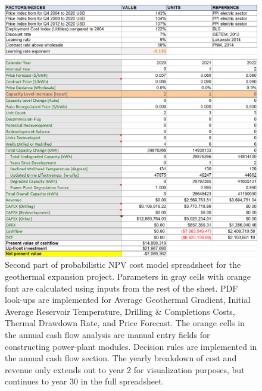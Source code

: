 \begin{figure}[H]
\centering
\includegraphics[width=\textwidth]{templates/images/Figure-Flexible_Model_SheetB.pdf}
\caption[Probabilistic cost model spreadsheet (part 2)]{Second part of probabilistic NPV cost model spreadsheet for the geothermal expansion project. Parameters in gray cells with orange font are calculated using inputs from the rest of the sheet. PDF look-ups are implemented for Average Geothermal Gradient, Initial Average Reservoir Temperature, Drilling \& Completions Costs, Thermal Drawdown Rate, and Price Forecast. The orange cells in the annual cash flow analysis are manual entry fields for constructing power-plant modules. Decision rules are implemented in the annual cash flow section. The yearly breakdown of cost and revenue only extends out to year 2 for visualization purposes, but continues to year 30 in the full spreadsheet.}
\label{fig:probabilistic_model_sheet2}
\end{figure}